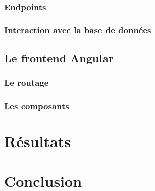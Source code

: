 \documentclass[11pt,a4paper]{report}
\begin{document}
\subsection{Endpoints}
\subsection{Interaction avec la base de données}
\section{Le frontend Angular}
\subsection{Le routage}
\subsection{Les composants}
\chapter{Résultats}
\chapter{Conclusion}


\end{document}
